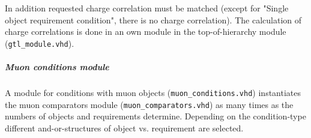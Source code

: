 In addition requested charge correlation must be matched (except for "Single object requirement condition", there is no charge correlation).
The calculation of charge correlations is done in an own module in the top-of-hierarchy module (\texttt{gtl\_module.vhd}).\\

\subparagraph{Muon conditions module}
A module for conditions with muon objects (\texttt{muon\_conditions.vhd}) instantiates the muon comparators module (\texttt{muon\_comparators.vhd}) as many times as
the numbers of objects and requirements determine. Depending on the condition-type different and-or-structures of object vs. requirement are selected.
% 
% 
% 
% 
